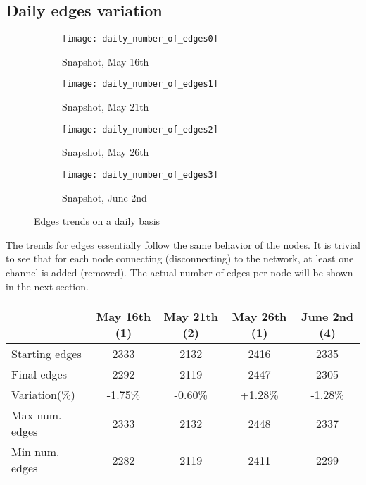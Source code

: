 	\subsection{Daily edges variation}

	\begin{figure}[h]
		\centering
		\begin{subfigure}{0.45\textwidth}
			\centering
			\texttt{[image: daily\_number\_of\_edges0]}
			\caption{Snapshot, May 16th}
			\label{daily_edges0}
		\end{subfigure}
		\begin{subfigure}{0.45\textwidth}
			\centering
			\texttt{[image: daily\_number\_of\_edges1]}
			\caption{Snapshot, May 21th}
			\label{daily_edges1}
		\end{subfigure}
		\begin{subfigure}{0.45\textwidth}
			\centering
			\texttt{[image: daily\_number\_of\_edges2]}
			\caption{Snapshot, May 26th}
			\label{daily_edges2}
		\end{subfigure}
		\begin{subfigure}{0.45\textwidth}
			\centering
			\texttt{[image: daily\_number\_of\_edges3]}
			\caption{Snapshot, June 2nd}
			\label{daily_edges3}
		\end{subfigure}
		
		\caption{Edges trends on a daily basis}
		\label{daily_edges_variation}
	\end{figure}

	The trends for edges essentially follow the same behavior of the nodes. It is trivial to see that for each node connecting (disconnecting) to the network, at least one channel is added (removed). The actual number of edges per node will be shown in the next section.
	
	\begin{center}
	\begin{tabulary}{\linewidth}{| L | C | C | C | C |}
		\hline
		& May 16th (\ref{daily_edges0}) & May 21th (\ref{daily_edges1}) & May 26th (\ref{daily_edges0}) & June 2nd (\ref{daily_edges3}) \\
		\hline
		Starting edges & 2333 & 2132 & 2416 & 2335 \\ \hline
		Final edges & 2292 & 2119 & 2447 & 2305 \\ \hline
		Variation(\%) & -1.75\% & -0.60\% & +1.28\% & -1.28\% \\ \hline
		Max num. edges & 2333 & 2132 & 2448 & 2337 \\ \hline
		Min num. edges & 2282 & 2119 & 2411 & 2299 \\ \hline	
	\end{tabulary}
	\end{center}


